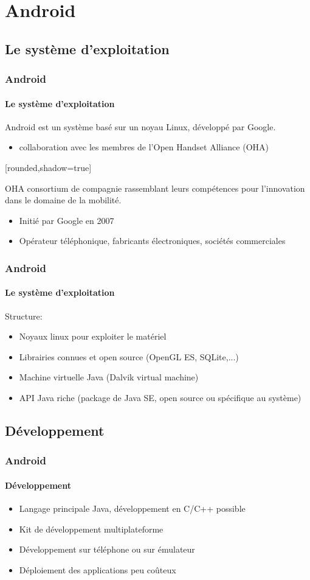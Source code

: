 \section{Android}

\subsection{Le système d'exploitation}

\begin{frame}
\frametitle{Android}
\framesubtitle{Le système d'exploitation}
Android est un système basé sur un noyau Linux, développé par Google.
\begin{itemize}
	\item collaboration avec les membres de l'Open Handset Alliance (OHA)
\end{itemize}
[rounded,shadow=true]
\begin{block}{OHA}
consortium de compagnie rassemblant leurs compétences pour l'innovation dans le domaine de la mobilité.
\begin{itemize}
	\item Initié par Google en 2007
	\item Opérateur téléphonique, fabricants électroniques, sociétés commerciales
\end{itemize}
\end{block}
\end{frame}

\begin{frame}
\frametitle{Android}
\framesubtitle{Le système d'exploitation}
Structure:
\begin{itemize}
	\item Noyaux linux pour exploiter le matériel
	\item Librairies connues et open source (OpenGL ES, SQLite,...)
	\item Machine virtuelle Java (Dalvik virtual machine)
	\item API Java riche (package de Java SE, open source ou spécifique au système)
\end{itemize}
\end{frame}

\subsection{Développement}

\begin{frame}
\frametitle{Android}
\framesubtitle{Développement}
\begin{itemize}
	\item Langage principale Java, développement en C/C++ possible
	\item Kit de développement multiplateforme
	\item Développement sur téléphone ou sur émulateur
	\item Déploiement des applications peu coûteux
\end{itemize}
\end{frame}

